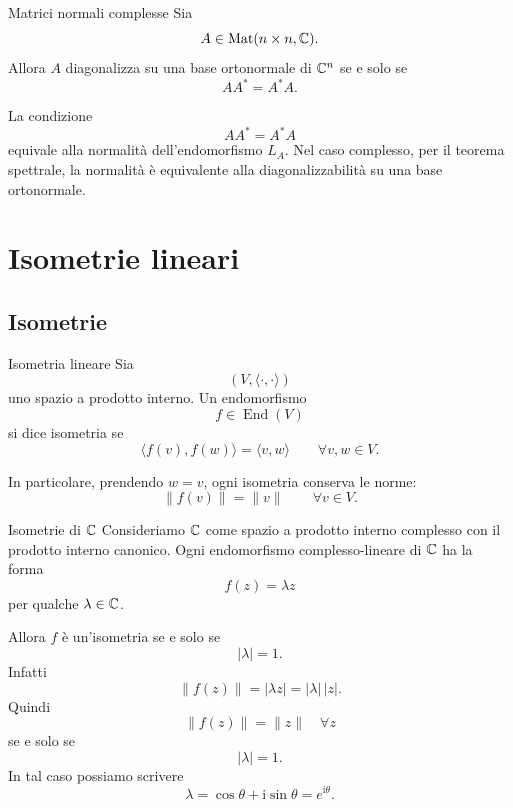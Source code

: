 \documentclass[a4paper]{article}
\begin{document}
\begin{snippetcorollary}{Matrici normali complesse}
    Sia
    \[
        A\in\operatorname{Mat}(n\times n,\mathbb{C}).
    \]
    Allora \(A\) diagonalizza su una base ortonormale di \(\mathbb{C}^n\) se e solo se
    \[
        AA^*=A^*A.
    \]
\end{snippetcorollary}

\begin{snippetproof}{}
    La condizione
    \[
        AA^*=A^*A
    \]
    equivale alla normalità dell'endomorfismo \(L_A\). Nel caso complesso, per il teorema spettrale, la normalità è equivalente alla diagonalizzabilità su una base ortonormale.
\end{snippetproof}

\section{Isometrie lineari}

\subsection{Isometrie}

\begin{snippetdefinition}{Isometria lineare}
    Sia
    \[
        (V,\langle\cdot,\cdot\rangle)
    \]
    uno spazio a prodotto interno. Un endomorfismo
    \[
        f\in\operatorname{End}(V)
    \]
    si dice isometria se
    \[
        \langle f(v),f(w)\rangle
        =
        \langle v,w\rangle
        \qquad
        \forall v,w\in V.
    \]
\end{snippetdefinition}

In particolare, prendendo \(w=v\), ogni isometria conserva le norme:
\[
    \|f(v)\|=\|v\|
    \qquad
    \forall v\in V.
\]

\begin{snippetexample}{Isometrie di \(\mathbb{C}\)}
    Consideriamo \(\mathbb{C}\) come spazio a prodotto interno complesso con il prodotto interno canonico. Ogni endomorfismo complesso-lineare di \(\mathbb{C}\) ha la forma
    \[
        f(z)=\lambda z
    \]
    per qualche \(\lambda\in\mathbb{C}\).

    Allora \(f\) è un'isometria se e solo se
    \[
        |\lambda|=1.
    \]
    Infatti
    \[
        \|f(z)\|=|\lambda z|=|\lambda|\,|z|.
    \]
    Quindi
    \[
        \|f(z)\|=\|z\|
        \quad
        \forall z
    \]
    se e solo se
    \[
        |\lambda|=1.
    \]
    In tal caso possiamo scrivere
    \[
        \lambda=\cos\theta+\mathrm{i}\sin\theta=e^{\mathrm{i}\theta}.
    \]
\end{snippetexample}
\end{document}
